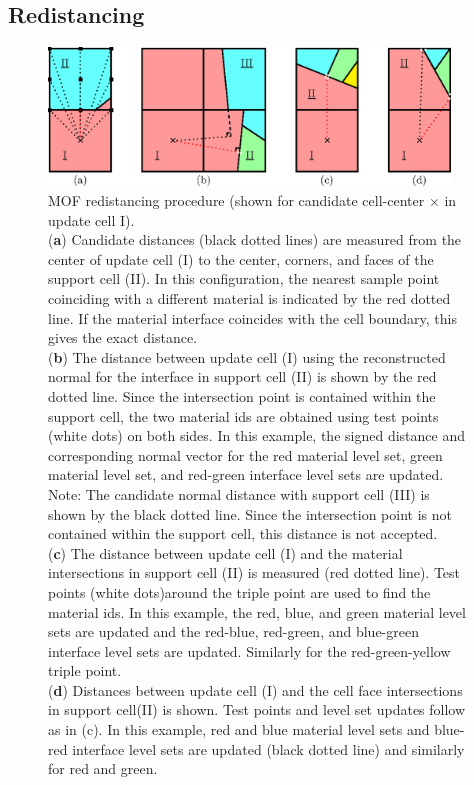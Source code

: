 \documentclass[preprint,12pt]{Definitions/elsarticle}
\begin{document}
\subsection{Redistancing}
\begin{figure}[H]
	\includegraphics[width=0.95\textwidth]{redistancing.eps}
	\caption{MOF redistancing procedure (shown for candidate cell-center $\times$ in update cell I).\\
		(\textbf{a}) Candidate distances (black dotted lines) are measured from the center of update cell (I) to the center, corners, and faces of the support cell (II). In this configuration, the nearest sample point coinciding with a different material is indicated by the red dotted line. If the material interface coincides with the cell boundary, this gives the exact distance.\\
		(\textbf{b}) The distance between update cell (I) using the reconstructed normal for the interface in support cell (II) is shown by the red dotted line. Since the intersection point is contained within the support cell, the two material ids are obtained using test points (white dots) on both sides. In this example, the signed distance and corresponding normal vector for the red material level set, green material level set, and red-green interface level sets are updated. Note: The candidate normal distance with support cell (III) is shown by the black dotted line. Since the intersection point is not contained within the support cell, this distance is not accepted.\\
		(\textbf{c}) The distance between update cell (I) and the material intersections in support cell (II) is measured (red dotted line). Test points (white dots)around the triple point are used to find the material ids. In this example, the red, blue, and green material level sets are updated and the red-blue, red-green, and blue-green interface level sets are updated. Similarly for the red-green-yellow triple point.\\
		(\textbf{d}) Distances between update cell (I) and the cell face intersections in support cell(II) is shown. Test points and level set updates follow as in (c). In this example, red and blue material level sets and blue-red interface level sets are updated (black dotted line) and similarly for red and green.}
	\label{fig:MOFredistancing}
\end{figure}   
\end{document}
